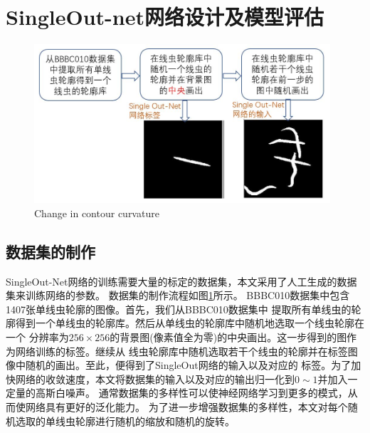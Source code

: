 \section{SingleOut-net网络设计及模型评估}
	\begin{figure}[htb]
	  \centering
	  \includegraphics[width=11cm]{figure/chap4/dataset.jpg}
		{Change in contour curvature}
	  \label{fig:chap4:dataset}
	\end{figure}
\subsection{数据集的制作}
\label{dataset}
	SingleOut-Net网络的训练需要大量的标定的数据集，本文采用了人工生成的数据集来训练网络的参数。
	数据集的制作流程如图\ref{fig:chap4:dataset}所示。
	BBBC010数据集\cite{Ljosa2012Annotated}中包含1407张单线虫轮廓的图像。首先，我们从BBBC010数据集中
	提取所有单线虫的轮廓得到一个单线虫的轮廓库。然后从单线虫的轮廓库中随机地选取一个线虫轮廓在一个
	分辨率为$256\times256$的背景图(像素值全为零)的中央画出。这一步得到的图作为网络训练的标签。继续从
	线虫轮廓库中随机选取若干个线虫的轮廓并在标签图像中随机的画出。至此，便得到了SingleOut网络的输入以及对应的
	标签。为了加快网络的收敛速度，本文将数据集的输入以及对应的输出归一化到$0\sim1$并加入一定量的高斯白噪声。
	通常数据集的多样性可以使神经网络学习到更多的模式，从而使网络具有更好的泛化能力。
	为了进一步增强数据集的多样性，本文对每个随机选取的单线虫轮廓进行随机的缩放和随机的旋转。

